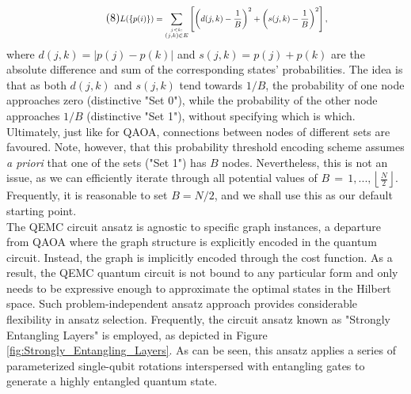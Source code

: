 \begin{equation}\tag{8}
    \scalebox{0.75}{$\displaystyle
    L(\{p(i)\}) = \sum_{\stackrel{j < k:}{(j,k)\in E}}\left[\left(d(j,k)-\frac{1}{B}\right)^{2}+\left(s(j,k)-\frac{1}{B}\right)^{2}\right],$}
\end{equation}
where $d(j,k) = |p(j) - p(k)|$ and $s(j, k) = p(j) + p(k)$ are the absolute difference and sum of the corresponding states' probabilities. The idea is that as both $d(j, k)$ and $s(j, k)$ tend towards $1/B$, the probability of one node approaches zero (distinctive "Set 0"), while the probability of the other node approaches $1/B$ (distinctive "Set 1"), without specifying which is which. Ultimately, just like for QAOA, connections between nodes of different sets are favoured. Note, however, that this probability threshold encoding scheme assumes \textit{a priori} that one of the sets ("Set 1") has $B$ nodes. Nevertheless, this is not an issue, as we can efficiently iterate through all potential values of $B\,=\,1,...,\left\lfloor{\frac{N}{2}}\right\rfloor$. Frequently, it is reasonable to set $B = N/2$, and we shall use this as our default starting point. \\

 The QEMC circuit ansatz is agnostic to specific graph instances, a departure from QAOA where the graph structure is explicitly encoded in the quantum circuit. Instead, the graph is implicitly encoded through the cost function. As a result, the QEMC quantum circuit is not bound to any particular form and only needs to be expressive enough to approximate the optimal states in the Hilbert space. Such problem-independent ansatz approach provides considerable flexibility in ansatz selection. Frequently, the circuit ansatz known as "Strongly Entangling Layers" is employed, as depicted in Figure \ref{fig:Strongly_Entangling_Layers}. As can be seen, this ansatz applies a series of parameterized single-qubit rotations interspersed with entangling gates to generate a highly entangled quantum state. %



